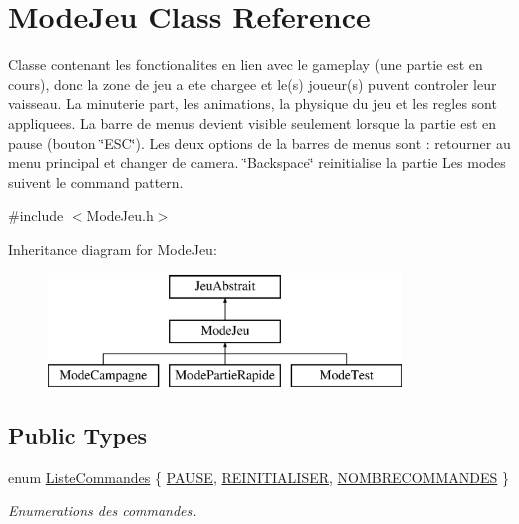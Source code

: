 \hypertarget{class_mode_jeu}{\section{Mode\-Jeu Class Reference}
\label{class_mode_jeu}
}


Classe contenant les fonctionalites en lien avec le gameplay (une partie est en cours), donc la zone de jeu a ete chargee et le(s) joueur(s) puvent controler leur vaisseau. La minuterie part, les animations, la physique du jeu et les regles sont appliquees. La barre de menus devient visible seulement lorsque la partie est en pause (bouton \char`\"{}\-E\-S\-C\char`\"{}). Les deux options de la barres de menus sont \-: retourner au menu principal et changer de camera. \char`\"{}\-Backspace\char`\"{} reinitialise la partie Les modes suivent le command pattern.  




{\ttfamily \#include $<$Mode\-Jeu.\-h$>$}

Inheritance diagram for Mode\-Jeu\-:\begin{figure}[H]
\begin{center}
\leavevmode
\includegraphics[height=3.000000cm]{class_mode_jeu}
\end{center}
\end{figure}
\subsection*{Public Types}
\begin{DoxyCompactItemize}
\item 
enum \hyperlink{group__inf2990_ga71285f3153fb23eef836554fd235cddf}{Liste\-Commandes} \{ \hyperlink{group__inf2990_gga71285f3153fb23eef836554fd235cddfa887190395d0fd1070502ab4d04e671f7}{P\-A\-U\-S\-E}, 
\hyperlink{group__inf2990_gga71285f3153fb23eef836554fd235cddfa3f5379be991400546c6e02ecf8a7fa21}{R\-E\-I\-N\-I\-T\-I\-A\-L\-I\-S\-E\-R}, 
\hyperlink{group__inf2990_gga71285f3153fb23eef836554fd235cddfa3da5995596a83fe1c39885d9b1292594}{N\-O\-M\-B\-R\-E\-C\-O\-M\-M\-A\-N\-D\-E\-S}
 \}
\begin{DoxyCompactList}\small\item\em Enumerations des commandes. \end{DoxyCompactList}\end{DoxyCompactItemize}
